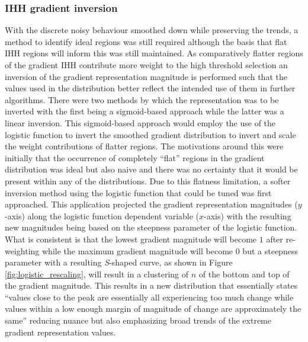 \subsubsection{IHH gradient inversion}
With the discrete noisy behaviour smoothed down while preserving the trends, a method to identify ideal regions was still required although the basis that flat IHH regions will inform this was still maintained. As comparatively flatter regions of the gradient IHH contribute more weight to the high threshold selection an inversion of the gradient representation magnitude is performed such that the values used in the distribution better reflect the intended use of them in further algorithms. There were two methods by which the representation was to be inverted with the first being a sigmoid-based approach while the latter was a linear inversion. This sigmoid-based approach would employ the use of the logistic function to invert the smoothed gradient distribution to invert and scale the weight contributions of flatter regions. The motivations around this were initially that the occurrence of completely ``flat'' regions in the gradient distribution was ideal but also naive and there was no certainty that it would be present within any of the distributions. Due to this flatness limitation, a softer inversion method using the logistic function that could be tuned was first approached. This application projected the gradient representation magnitudes ($y$-axis) along the logistic function dependent variable ($x$-axis) with the resulting new magnitudes being based on the steepness parameter of the logistic function. What is consistent is that the lowest gradient magnitude will become $1$ after re-weighting while the maximum gradient magnitude will become $0$ but a steepness parameter with a resulting \textit{S}-shaped curve, as shown in Figure \ref{fig:logistic_rescaling}, will result in a clustering of $n$ of the bottom and top of the gradient magnitude. This results in a new distribution that essentially states ``values close to the peak are essentially all experiencing too much change while values within a low enough margin of magnitude of change are approximately the same'' reducing nuance but also emphasizing broad trends of the extreme gradient representation values. 
